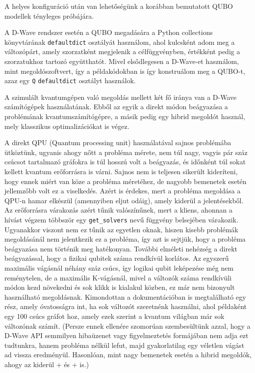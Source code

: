 A helyes konfiguráció után van lehetőségünk a korábban bemutatott QUBO modellek tényleges próbájára.

A D-Wave rendszer esetén a QUBO megadására a Python collections könyvtárának \verb+defaultdict+ osztályát használom, ahol kulcsként adom meg a változópárt, amely szorzatként megjelenik a célfüggvényben, értékként pedig a szorzatukhoz tartozó együtthatót. Mivel elsődlegesen a D-Wave-et használom, mint megoldószoftvert, így a példakódokban is így konstruálom meg a QUBO-t, azaz egy \verb+Q+ \verb+defaultdict+ osztályt használok.

A szimulált kvantumgépen való megoldás mellett két fő iránya van a D-Wave számítógépek használatának. Ebből az egyik a direkt módon beágyazása a problémának kvantumszámítógépre, a másik pedig egy hibrid megoldót használ, mely klasszikus optimalizációkat is végez.


A direkt QPU (Quantum processing unit) használatával sajnos problémába ütköztünk, ugyanis ahogy nőtt a probléma mérete, nem túl nagy, vagyis pár száz csúcsot tartalmazó gráfokra is túl hosszú volt a beágyazás, és időnként túl sokat kellett kvantum erőforrásra is várni. Sajnos nem is teljesen sikerült kideríteni, hogy ennek miért van köze a probléma méretéhez, de nagyobb bemenetek esetén jellemzőbb volt ez a viselkedés. Azért is érdekes, mert a probléma megoldása a QPU-n hamar elkészül (amennyiben eljut odáig), amely kiderül a jelentésekből. Az erőforrásra várakozás azért tűnik valószínűnek, mert a kliens, ahonnan a hívást végzem többször egy \verb+get_solvers+ nevű függvény belsejében várakozik. Ugyanakkor viszont nem ez tűnik az egyetlen oknak, hiszen kisebb problémák megoldásánál nem jelentkezik ez a probléma, így azt is sejtjük, hogy a probléma beágyazása nem történik meg hatékonyan.
További elméleti nehézség a direkt beágyazással, hogy a fizikai qubitek száma rendkívül korlátos. Az egyszerű maximális vágásnál néhány száz csúcs, így logikai qubit leképezése még nem reménytelen, de a maximális K-vágásnál, mivel a változók száma rendkívüli módon kezd növekedni és sok klikk is kialakul közben, ez már nem bizonyult használható megoldásnak. Kimondottan a dokumentációban is megtalálható egy rész, amely óvatosságra int, ha sok változót szeretnénk használni, ahol példaként egy 100 csúcs gráfot hoz, amely ezek szerint a kvantum világban már sok változónak számít. (Persze ennek ellenére szomorúan szembesültünk azzal, hogy a D-Wave API semmilyen hibaüzenet vagy figyelmeztetés formájában nem adja ezt tudtunkra, hanem probléma nélkül lefut, majd gyakorlatilag egy véletlen vágást ad vissza eredményül. Hasonlóan, mint nagy bemenetek esetén a hibrid megoldók, ahogy az kiderül \az+ és \az+ is.)

